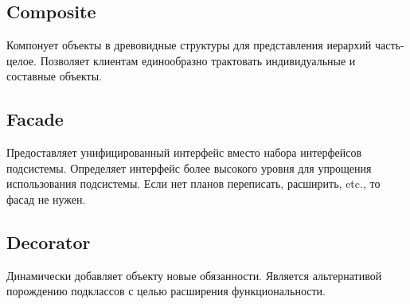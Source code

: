 \documentclass[11pt,a4paper]{article}
\begin{document}
\subsection{Composite}
Компонует объекты в древовидные структуры для представления иерархий часть-целое. Позволяет клиентам единообразно трактовать индивидуальные и составные объекты.

\subsection{Facade}
Предоставляет унифицированный интерфейс вместо набора интерфейсов подсистемы. Определяет интерфейс более высокого уровня для упрощения использования подсистемы. Если нет планов переписать, расширить, etc., то фасад не нужен.

\subsection{Decorator}
Динамически добавляет объекту новые обязанности. Является альтернативой порождению подклассов с целью расширения функциональности.
\end{document}
